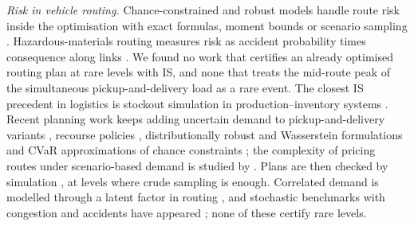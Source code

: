\documentclass[11pt]{article}
\theoremstyle{definition}
\theoremstyle{remark}
\begin{document}
\emph{Risk in vehicle routing.} Chance-constrained and robust models
\citep{GounarisWiesemannFloudas2013,DinhFukasawaLuedtke2018,GhosalWiesemann2020}
handle route risk inside the optimisation with exact formulas, moment bounds or
scenario sampling \citep{GendreauJabaliRei2016}. Hazardous-materials routing
measures risk as accident probability times consequence along links
\citep{ErkutVerter1998}. We found no work that certifies an already optimised
routing plan at rare levels with IS, and none that treats the mid-route peak
of the simultaneous pickup-and-delivery load \citep{Dethloff2001} as a rare
event. The closest IS precedent in logistics is stockout simulation in
production--inventory systems \citep{GlassermanLiu1996}.
Recent planning work keeps adding uncertain demand to pickup-and-delivery
variants \citep{hu2025vehicle}, recourse policies
\citep{salavati2019rulebased}, distributionally robust and Wasserstein
formulations \citep{yin2022distributionally,wang2023distributionally,Ghosal2024Unifying}
and CVaR approximations of chance constraints \citep{Zhang2021Vehicle,thiebaut2022approximating};
the complexity of pricing routes under scenario-based demand is studied by
\citet{ota2025hardness}. Plans are then checked by simulation
\citep{wang2025simulation}, at levels where crude sampling is enough. Correlated
demand is modelled through a latent factor in routing \citep{Florio2023Recent},
and stochastic benchmarks with congestion and accidents have appeared
\citep{Heakl2025SVRPBench}; none of these certify rare levels.
\end{document}
